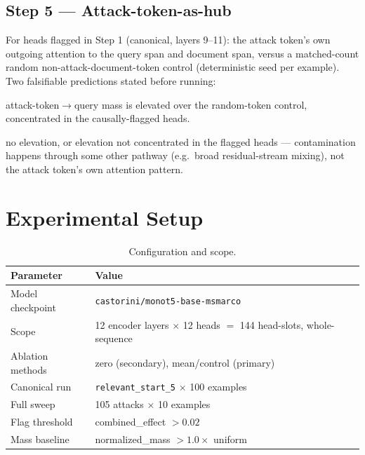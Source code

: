 \documentclass[11pt]{article}
\begin{document}
\subsection{Step 5 — Attack-token-as-hub}
For heads flagged in Step 1 (canonical, layers 9--11): the attack token's own outgoing
attention to the query span and document span, versus a matched-count random
non-attack-document-token control (deterministic seed per example). Two falsifiable
predictions stated before running:
\begin{description}[leftmargin=1.4em,style=nextline]
  \item[Hub hypothesis] attack-token$\to$query mass is elevated over the random-token
  control, concentrated in the causally-flagged heads.
  \item[Passive hypothesis] no elevation, or elevation not concentrated in the flagged
  heads — contamination happens through some other pathway (e.g.\ broad residual-stream
  mixing), not the attack token's own attention pattern.
\end{description}

\section{Experimental Setup}

\begin{table}[H]
\centering
\caption{Configuration and scope.}
\begin{tabular}{ll}
\toprule
Parameter & Value \\
\midrule
Model checkpoint & \texttt{castorini/monot5-base-msmarco} \\
Scope & 12 encoder layers $\times$ 12 heads $=$ 144 head-slots, whole-sequence \\
Ablation methods & zero (secondary), mean/control (primary) \\
Canonical run & \texttt{relevant\_start\_5} $\times$ 100 examples \\
Full sweep & 105 attacks $\times$ 10 examples \\
Flag threshold & combined\_effect $> 0.02$ \\
Mass baseline & normalized\_mass $> 1.0\times$ uniform \\
\bottomrule
\end{tabular}
\end{table}
\end{document}
